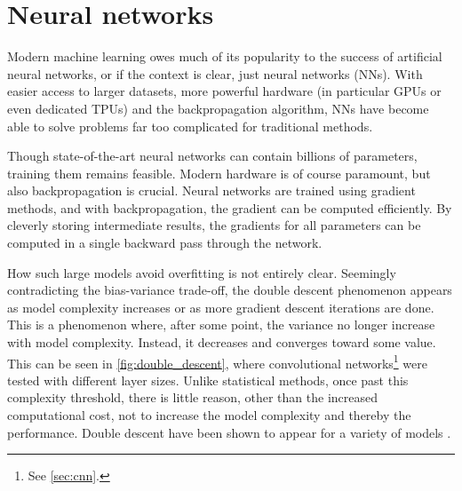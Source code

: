 \section{Neural networks}
Modern machine learning owes much of its popularity to the success of artificial neural networks, or if the context is clear, just neural networks (NNs).
With easier access to larger datasets, more powerful hardware (in particular GPUs or even dedicated TPUs) and the backpropagation algorithm, NNs have become able to solve problems far too complicated for traditional methods.

Though state-of-the-art neural networks can contain billions of parameters, training them remains feasible.
Modern hardware is of course paramount, but also backpropagation is crucial.
Neural networks are trained using gradient methods, and with backpropagation, the gradient can be computed efficiently.
By cleverly storing intermediate results, the gradients for all parameters can be computed in a single backward pass through the network.

How such large models avoid overfitting is not entirely clear.
Seemingly contradicting the bias-variance trade-off, the double descent phenomenon appears as model complexity increases or as more gradient descent iterations are done.
This is a phenomenon where, after some point, the variance no longer increase with model complexity.
Instead, it decreases and converges toward some value.
This can be seen in \cref{fig:double_descent}, where convolutional networks\footnote{See \cref{sec:cnn}.} were tested with different layer sizes.
Unlike statistical methods, once past this complexity threshold, there is little reason, other than the increased computational cost, not to increase the model complexity and thereby the performance.
Double descent have been shown to appear for a variety of models \cite{nakkiran2021}.

